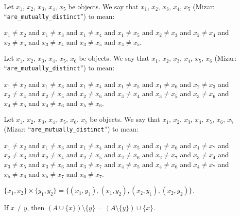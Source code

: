 \documentclass{article}
\begin{document}
\begin{definition}
Let $x_{1}$, $x_{2}$, $x_{3}$, $x_{4}$, $x_{5}$ be objects.
We say that $x_{1}$, $x_{2}$, $x_{3}$, $x_{4}$, $x_{5}$ 
(Mizar: ``\verb#are_mutually_distinct#'') to mean:
\begin{defn}
\item $x_{1}\neq x_{2}$ and $x_{1}\neq x_{3}$ and $x_{1}\neq x_{4}$ and
  $x_{1}\neq x_{5}$ and $x_{2}\neq x_{3}$ and $x_{2}\neq x_{4}$ and $x_{2}\neq x_{5}$
  and $x_{3}\neq x_{4}$ and $x_{3}\neq x_{5}$ and $x_{4}\neq x_{5}$.
\end{defn}
\end{definition}

\begin{definition}
Let $x_{1}$, $x_{2}$, $x_{3}$, $x_{4}$, $x_{5}$, $x_{6}$ be objects.
We say that $x_{1}$, $x_{2}$, $x_{3}$, $x_{4}$, $x_{5}$, $x_{6}$ 
(Mizar: ``\verb#are_mutually_distinct#'') to mean:
\begin{defn}
\item $x_{1}\neq x_{2}$ and $x_{1}\neq x_{3}$ and $x_{1}\neq x_{4}$ and $x_{1}\neq x_{5}$ and $x_{1}\neq x_{6}$ and
  $x_{2}\neq x_{3}$ and $x_{2}\neq x_{4}$ and $x_{2}\neq x_{5}$ and $x_{2}\neq x_{6}$ and
  $x_{3}\neq x_{4}$ and $x_{3}\neq x_{5}$ and $x_{3}\neq x_{6}$ and
  $x_{4}\neq x_{5}$ and $x_{4}\neq x_{6}$ and
  $x_{5}\neq x_{6}$.
\end{defn}
\end{definition}

\begin{definition}
Let $x_{1}$, $x_{2}$, $x_{3}$, $x_{4}$, $x_{5}$, $x_{6}$, $x_{7}$ be objects.
We say that $x_{1}$, $x_{2}$, $x_{3}$, $x_{4}$, $x_{5}$, $x_{6}$, $x_{7}$ 
(Mizar: ``\verb#are_mutually_distinct#'') to mean:
\begin{defn}
\item $x_{1}\neq x_{2}$ and $x_{1}\neq x_{3}$ and $x_{1}\neq x_{4}$ and $x_{1}\neq x_{5}$ and $x_{1}\neq x_{6}$ and $x_{1}\neq x_{7}$ and
  $x_{2}\neq x_{3}$ and $x_{2}\neq x_{4}$ and $x_{2}\neq x_{5}$ and $x_{2}\neq x_{6}$ and $x_{2}\neq x_{7}$ and
  $x_{3}\neq x_{4}$ and $x_{3}\neq x_{5}$ and $x_{3}\neq x_{6}$ and $x_{3}\neq x_{7}$ and
  $x_{4}\neq x_{5}$ and $x_{4}\neq x_{6}$ and $x_{4}\neq x_{7}$ and
  $x_{5}\neq x_{6}$ and $x_{5}\neq x_{7}$ and
  $x_{6}\neq x_{7}$.
\end{defn}
\end{definition}

\begin{thm}
\item\label{zfmisc1:122} $\{x_{1},x_{2}\}\times\{y_{1},y_{2}\}=\{(x_{1},y_{1}), (x_{1},y_{2}),(x_{2},y_{1}),(x_{2},y_{2})\}$.
\item\label{zfmisc1:123} If $x\neq y$, then $(A\cup\{x\})\setminus\{y\}=(A\setminus\{y\})\cup\{x\}$.
\end{thm}
\end{document}
